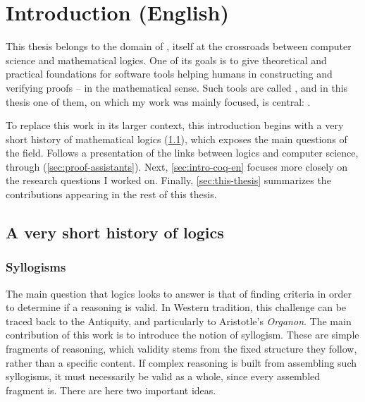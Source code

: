 \chapter{Introduction (English)}
\label{chap:intro-en}

\margintoc

This thesis belongs to the domain of , itself
at the crossroads between computer science and mathematical logics.
One of its goals is to give theoretical and practical foundations
for software tools helping humans in constructing and verifying proofs –
in the mathematical sense.
Such tools are called , and in this thesis one of them, on
which my work was mainly focused, is central: .

To replace this work in its larger context, this introduction begins with a very
short history of mathematical logics (\cref{sec:logic-history}), which exposes the
main questions of the field. Follows a presentation of the links between logics and
computer science, through  (\cref{sec:proof-assistants}).
Next, \cref{sec:intro-coq-en} focuses more closely on the research questions I worked on.
Finally, \cref{sec:this-thesis} summarizes the contributions appearing in the rest of
this thesis.

\section{A very short history of logics}
\label{sec:logic-history}

\subsection{Syllogisms}

The main question that logics looks to answer is that of finding criteria in order to determine
if a reasoning is valid. In Western tradition, this challenge can be traced back to the
Antiquity, and particularly to Aristotle's \textit{Organon}.
The main contribution of this work is to introduce the notion of syllogism.
These are simple fragments of reasoning, which validity stems from the
fixed structure they follow, rather than a specific content.%
If complex reasoning is built from assembling such syllogisms, it must necessarily be valid as
a whole, since every assembled fragment is. There are here two important ideas.

